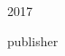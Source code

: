 \begin{titlepage}
	\vfill %
	
	
	\plogo %
	
	\vspace{0.3\baselineskip} %
	
	2017 %
	
	{\large publisher} %

\end{titlepage}